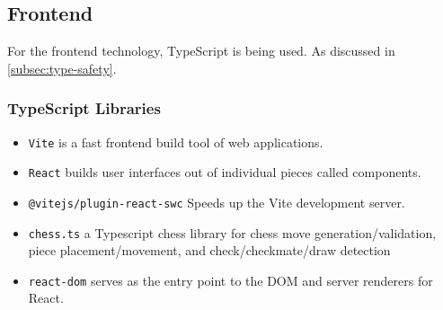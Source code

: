 \subsection{Frontend}

For the frontend technology, TypeScript is being used. As discussed in \ref{subsec:type-safety}.

\subsubsection*{TypeScript Libraries}

\begin{itemize}
    \item \texttt{Vite} is a fast frontend build tool of web applications. \cite{ts:vite}
    
    \item \texttt{React} builds user interfaces out of individual pieces called components. \cite{ts:react}
    
    \item \texttt{@vitejs/plugin-react-swc} Speeds up the Vite development server. \cite{ts:swc}
    
    \item \texttt{chess.ts} a Typescript chess library for chess move generation/validation, piece placement/movement, and check/checkmate/draw detection \cite{ts:chess}
    
    \item \texttt{react-dom} serves as the entry point to the DOM and server renderers for React. \cite{ts:react-dom}
\end{itemize}